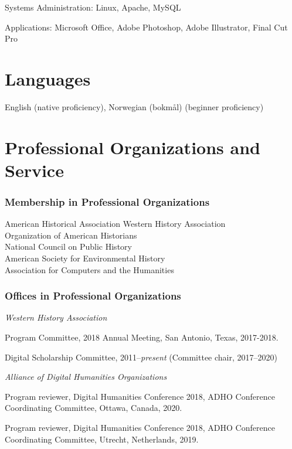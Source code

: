 Systems Administration: Linux, Apache, MySQL

Applications: Microsoft Office, Adobe Photoshop, Adobe Illustrator,
Final Cut Pro

\section{Languages}\label{languages}

English (native proficiency), Norwegian (bokm\r{a}l) (beginner
proficiency)

\section{Professional Organizations and
Service}\label{professional-organizations-and-service}

\subsubsection{Membership in Professional
Organizations}\label{membership-in-professional-organizations}

American Historical Association Western History Association\\
Organization of American Historians\\
National Council on Public History\\
American Society for Environmental History\\
Association for Computers and the Humanities

\subsubsection{Offices in Professional
Organizations}\label{offices-in-professional-organizations}

\emph{Western History Association}

Program Committee, 2018 Annual Meeting, San Antonio, Texas, 2017-2018.

Digital Scholarship Committee, 2011--\emph{present} (Committee chair,
2017--2020)

\vspace{.4cm}

\emph{Alliance of Digital Humanities Organizations}

Program reviewer, Digital Humanities Conference 2018, ADHO Conference
Coordinating Committee, Ottawa, Canada, 2020.

Program reviewer, Digital Humanities Conference 2018, ADHO Conference
Coordinating Committee, Utrecht, Netherlands, 2019.


